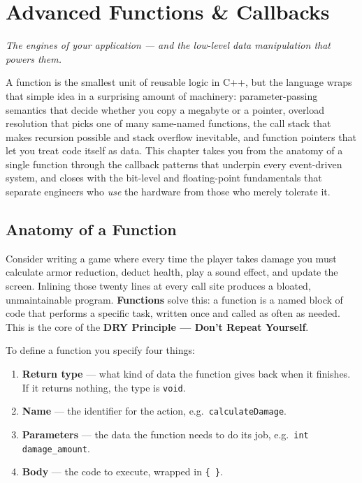 \chapter{Advanced Functions \& Callbacks}
\label{ch:advanced-functions-callbacks}

\textit{The engines of your application --- and the low-level data manipulation that powers them.}

A function is the smallest unit of reusable logic in C++, but the language wraps that simple idea in a surprising amount of machinery: parameter-passing semantics that decide whether you copy a megabyte or a pointer, overload resolution that picks one of many same-named functions, the call stack that makes recursion possible and stack overflow inevitable, and function pointers that let you treat code itself as data. This chapter takes you from the anatomy of a single function through the callback patterns that underpin every event-driven system, and closes with the bit-level and floating-point fundamentals that separate engineers who \textit{use} the hardware from those who merely tolerate it.

\section{Anatomy of a Function}
\label{sec:function-anatomy}

Consider writing a game where every time the player takes damage you must calculate armor reduction, deduct health, play a sound effect, and update the screen. Inlining those twenty lines at every call site produces a bloated, unmaintainable program. \textbf{Functions} solve this: a function is a named block of code that performs a specific task, written once and called as often as needed. This is the core of the \textbf{DRY Principle --- Don't Repeat Yourself}.

To define a function you specify four things:

\begin{enumerate}
    \item \textbf{Return type} --- what kind of data the function gives back when it finishes. If it returns nothing, the type is \texttt{void}.
    \item \textbf{Name} --- the identifier for the action, e.g.\ \texttt{calculateDamage}.
    \item \textbf{Parameters} --- the data the function needs to do its job, e.g.\ \texttt{int damage\_amount}.
    \item \textbf{Body} --- the code to execute, wrapped in \texttt{\{ \}}.
\end{enumerate}

